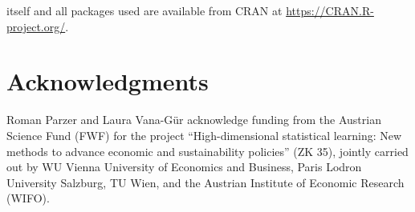 \documentclass[
  article]{jss}
\begin{document}
 itself and all packages used are available from CRAN at
\url{https://CRAN.R-project.org/}.

\section*{Acknowledgments}\label{acknowledgments}

Roman Parzer and Laura Vana-Gür acknowledge funding from the Austrian
Science Fund (FWF) for the project ``High-dimensional statistical
learning: New methods to advance economic and sustainability policies''
(ZK 35), jointly carried out by WU Vienna University of Economics and
Business, Paris Lodron University Salzburg, TU Wien, and the Austrian
Institute of Economic Research (WIFO).


\renewcommand\refname{References}
  
\end{document}
